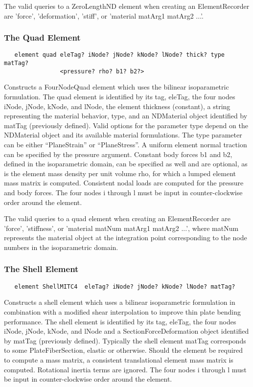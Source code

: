 \documentclass[12pt]{article}
\begin{document}
The valid queries to a ZeroLengthND element when creating an ElementRecorder
are 'force', 'deformation', 'stiff', or 'material matArg1 matArg2 ...'.

\subsubsection{The Quad Element}
{\sf\small
\begin{verbatim}
   element quad eleTag? iNode? jNode? kNode? lNode? thick? type matTag? 
                <pressure? rho? b1? b2?>
\end{verbatim}
}

\noindent Constructs a FourNodeQuad element which uses the bilinear
isoparametric formulation. The quad element is identified by its tag,
eleTag, the four nodes iNode, jNode, kNode, and lNode, the element
thickness (constant), a string representing the material behavior,
type, and an NDMaterial object identified by matTag (previously
defined). Valid options for the parameter type depend on the
NDMaterial object and its available material formulations. The type parameter
can be either ``PlaneStrain'' or ``PlaneStress''. A uniform element
normal traction can be specified by the pressure argument. Constant
body forces b1 and b2, defined in the isoparametric domain, can be
specified as well and are optional, as is the element mass density per
unit volume rho, for which a lumped element mass matrix is
computed. Consistent nodal loads are computed for the pressure and
body forces. The four nodes i through l must be input in
counter-clockwise order around the element.

The valid queries to a quad element when creating an ElementRecorder
are 'force', 'stiffness', or 'material matNum matArg1 matArg2 ...',  where matNum
represents the material object at the integration point corresponding to the node numbers
in the isoparametric domain.


\subsubsection{The Shell Element}
{\sf\small
\begin{verbatim}
   element ShellMITC4  eleTag? iNode? jNode? kNode? lNode? matTag? 
\end{verbatim}
}

\noindent 
Constructs a shell element which uses a bilinear
isoparametric formulation in combination with a modified shear
interpolation to improve thin plate bending performance. 
The shell element is identified by its tag,
eleTag, the four nodes iNode, jNode, kNode, and lNode 
and a SectionForceDeformation object identified by matTag (previously
defined). 
Typically the shell element matTag corresponds to some PlateFiberSection,
elastic or otherwise.
Should the element be required to compute a mass matrix, a consistent 
translational element mass matrix is computed.  Rotational inertia terms 
are ignored.
The four nodes i through l must be input in
counter-clockwise order around the element.
\end{document}
